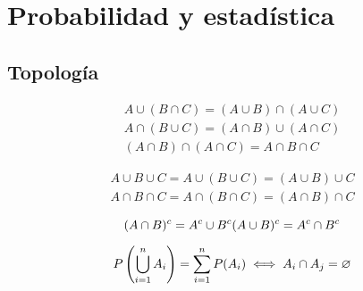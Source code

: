 \chapter{Probabilidad y estadística}

\section{Topología}

\begin{mdframed}[style=PropertyFrame]
    \begin{prop}
    \end{prop}
    \begin{gather*}
        A \cup (B \cap C) = (A \cup B) \cap (A \cup C)
        \\
        A \cap (B \cup C) = (A \cap B) \cup (A \cap C)
        \\[1ex]
        (A \cap B) \cap (A \cap C) = A \cap B \cap C
    \end{gather*}
\end{mdframed}

\begin{mdframed}[style=PropertyFrame]
    \begin{prop}
    \end{prop}
    \begin{gather*}
        A \cup B \cup C = A \cup (B \cup C) = (A \cup B) \cup C
        \\
        A \cap B \cap C = A \cap (B \cap C) = (A \cap B) \cap C
    \end{gather*}
\end{mdframed}

\begin{mdframed}[style=PropertyFrame]
    \begin{prop}
    \end{prop}
    \begin{equation*}
        (A \cap B)^c = A^c \cup B^c
        \\
        (A \cup B)^c = A^c \cap B^c
    \end{equation*}
\end{mdframed}

\begin{mdframed}[style=PropertyFrame]
    \begin{prop}
    \end{prop}
    \begin{equation*}
        P \left( \bigcup_{i=1}^n A_i \right) = \sum_{i=1}^n P(A_i)
        \iff A_i \cap A_j = \varnothing
    \end{equation*}
\end{mdframed}


